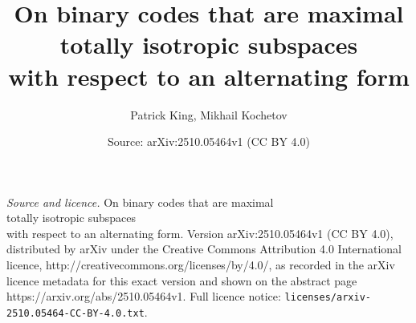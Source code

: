 \documentclass[10pt,a4paper]{amsart}
\title{On binary codes that are maximal\\ totally isotropic subspaces\\ with respect to an alternating form}
\author{Patrick King, Mikhail Kochetov}
\date{Source: arXiv:2510.05464v1 (CC BY 4.0)}
\begin{document}
\maketitle

\noindent\emph{Source and licence.} On binary codes that are maximal\\ totally isotropic subspaces\\ with respect to an alternating form. Version arXiv:2510.05464v1 (CC BY 4.0), distributed by arXiv under the Creative Commons Attribution 4.0 International licence, http://creativecommons.org/licenses/by/4.0/, as recorded in the arXiv licence metadata for this exact version and shown on the abstract page https://arxiv.org/abs/2510.05464v1. Full licence notice: \texttt{licenses/arxiv-2510.05464-CC-BY-4.0.txt}.\par\smallskip
\end{document}
